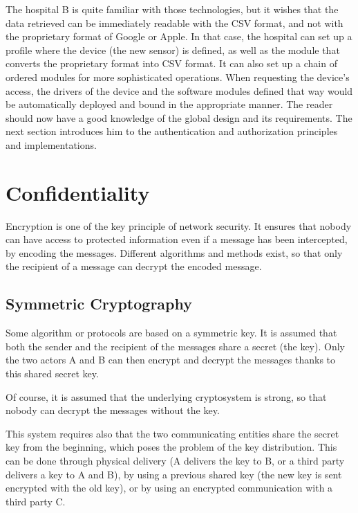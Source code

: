 The hospital B is quite familiar with those technologies, but it wishes that the data retrieved can be immediately readable with the CSV format, and not with the proprietary format of Google or Apple. In that case, the hospital can set up a profile where the device (the new sensor) is defined, as well as the module that converts the proprietary format into CSV format. It can also set up a chain of ordered modules for more sophisticated operations. When requesting the device's access, the drivers of the device and the software modules defined that way would be automatically deployed and bound in the appropriate manner.
\linebreak
\linebreak
\linebreak
The reader should now have a good knowledge of the global design and its requirements. The next section introduces him to the authentication and authorization principles and implementations.

\section{Confidentiality}
Encryption is one of the key principle of network security. It ensures that nobody can have access to protected information even if a message has been intercepted, by encoding the messages. Different algorithms and methods exist, so that only the recipient of a message can decrypt the encoded message.

\subsection{Symmetric Cryptography}
\label{sec:02_symmetric_keys}
Some algorithm or protocols are based on a symmetric key. It is assumed that both the sender and the recipient of the messages share a secret (the key). Only the two actors A and B can then encrypt and decrypt the messages thanks to this shared secret key.

Of course, it is assumed that the underlying cryptosystem is strong, so that nobody can decrypt the messages without the key.

This system requires also that the two communicating entities share the secret key from the beginning, which poses the problem of the key distribution. This can be done through physical delivery (A delivers the key to B, or a third party delivers a key to A and B), by using a previous shared key (the new key is sent encrypted with the old key), or by using an encrypted communication with a third party C.
 
